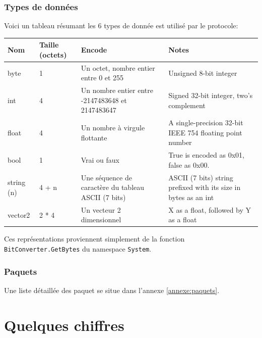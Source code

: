 \documentclass[a4paper]{article}
\begin{document}
\subsubsection{Types de données}
Voici un tableau résumant les 6 types de donnée est utilisé par le protocole:
\begin{center}
\begin{tabular}{|l|m{1.5cm}|m{5cm}|m{5cm}|}
    \hline
    Nom & Taille (octets) & Encode & Notes \\
    \hline\hline
    byte & 1 & Un octet, nombre entier entre 0 et 255 & Unsigned 8-bit integer \\
    \hline
    int & 4 & Un nombre entier entre -2147483648 et 2147483647  & Signed 32-bit integer, two's complement \\
    \hline
    float & 4 & Un nombre à virgule flottante & A single-precision 32-bit IEEE 754 floating point number \\
    \hline
    bool & 1 & Vrai ou faux & True is encoded as 0x01, false as 0x00. \\
    \hline
    string (n) & 4 + n & Une séquence de caractère du tableau ASCII (7 bits) & ASCII (7 bits) string prefixed with its size in bytes as an int \\
    \hline
    vector2 & 2 * 4 & Un vecteur 2 dimensionnel & X as a float, followed by Y as a float \\
    \hline
\end{tabular}
\end{center}
Ces représentations proviennent simplement de la fonction \texttt{BitConverter.GetBytes} du namespace\cite{namespace} \texttt{System}.

\subsubsection{Paquets}
Une liste détaillée des paquet se situe dans l'annexe \ref{annexe:paquets}.
\newpage
\section{Quelques chiffres}
\label{section:chiffres}
\end{document}
